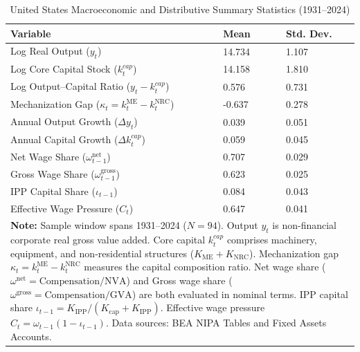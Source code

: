 \begin{table}[H]
\centering
\caption{United States Macroeconomic and Distributive Summary Statistics (1931--2024)}
\label{tab:us_stylized_facts_summary}
\begin{tabular}{p{7.5cm} p{2.5cm} p{2.5cm}}
\hline\hline
\textbf{Variable} & \textbf{Mean} & \textbf{Std. Dev.} \\
\hline
Log Real Output ($y_t$) & 14.734 & 1.107 \\
Log Core Capital Stock ($k_t^{cap}$) & 14.158 & 1.810 \\
Log Output--Capital Ratio ($y_t - k_t^{cap}$) & 0.576 & 0.731 \\
Mechanization Gap ($\kappa_t = k_t^{\text{ME}} - k_t^{\text{NRC}}$) & -0.637 & 0.278 \\
Annual Output Growth ($\Delta y_t$) & 0.039 & 0.051 \\
Annual Capital Growth ($\Delta k_t^{cap}$) & 0.059 & 0.045 \\
Net Wage Share ($\omega_{t-1}^{\text{net}}$) & 0.707 & 0.029 \\
Gross Wage Share ($\omega_{t-1}^{\text{gross}}$) & 0.623 & 0.025 \\
IPP Capital Share ($\iota_{t-1}$) & 0.084 & 0.043 \\
Effective Wage Pressure ($C_t$) & 0.647 & 0.041 \\
\hline\hline
\multicolumn{3}{p{13.0cm}}{\footnotesize \textbf{Note:} Sample window spans 1931--2024 ($N = 94$). Output $y_t$ is non-financial corporate real gross value added. Core capital $k_t^{cap}$ comprises machinery, equipment, and non-residential structures ($K_{\text{ME}} + K_{\text{NRC}}$). Mechanization gap $\kappa_t = k_t^{\text{ME}} - k_t^{\text{NRC}}$ measures the capital composition ratio. Net wage share ($\omega^{\text{net}} = \text{Compensation} / \text{NVA}$) and Gross wage share ($\omega^{\text{gross}} = \text{Compensation} / \text{GVA}$) are both evaluated in nominal terms. IPP capital share $\iota_{t-1} = K_{\text{IPP}} / (K_{\text{cap}} + K_{\text{IPP}})$. Effective wage pressure $C_t = \omega_{t-1}(1 - \iota_{t-1})$. Data sources: BEA NIPA Tables and Fixed Assets Accounts.} \\
\end{tabular}
\end{table}

